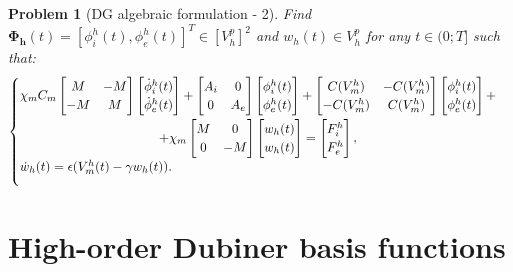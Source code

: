 \documentclass[a4paper,11pt]{article}
\newtheorem{problem}{Problem}
\begin{document}
 \begin{problem}[DG algebraic formulation - 2] \label{block_matrix}
 Find $\bm{\Phi_h}(t)=[\phi_i^h(t),\phi_e^h(t)]^T \in [V_h^p]^2$ and $w_h(t) \in V_h^p$ for any $t \in (0;T]$ such that:
 \begin{equation*}
 \begin{cases}
 \begin{gathered}
 \chi_mC_m \begin{bmatrix}M &-M \\ -M & M \end{bmatrix}
	\begin{bmatrix}\dot{\phi}_i^h(t) \\ \dot{\phi}_e^h(t) \end{bmatrix}
	 + \begin{bmatrix}A_i & 0 \\ 0 & A_e \end{bmatrix}
	 \begin{bmatrix}\phi_i^h(t) \\ \phi_e^h(t) \end{bmatrix} +
	   \begin{bmatrix}C(V_m^h) & -C(V_m^h) \\ -C(V_m^h) & C(V_m^h) \end{bmatrix} 
	   \begin{bmatrix} \phi_i^h(t) \\ \phi_e^h(t)  \end{bmatrix}+\\
	   +\chi_m \begin{bmatrix}M & 0 \\ 0 & -M \end{bmatrix} 
	   	\begin{bmatrix}w_h(t) \\ w_h(t) \end{bmatrix} = 
	   	\begin{bmatrix} F_i^h \\ F_e^h\end{bmatrix},
	   	\end{gathered}\\
	   	\vspace{3mm} 
	   \dot{w}_h(t)=\epsilon (V_m^h(t)-\gamma w_h(t)).
\end{cases}
\end{equation*}
\end{problem}
\newpage
\section{High-order Dubiner basis functions}
\end{document}
